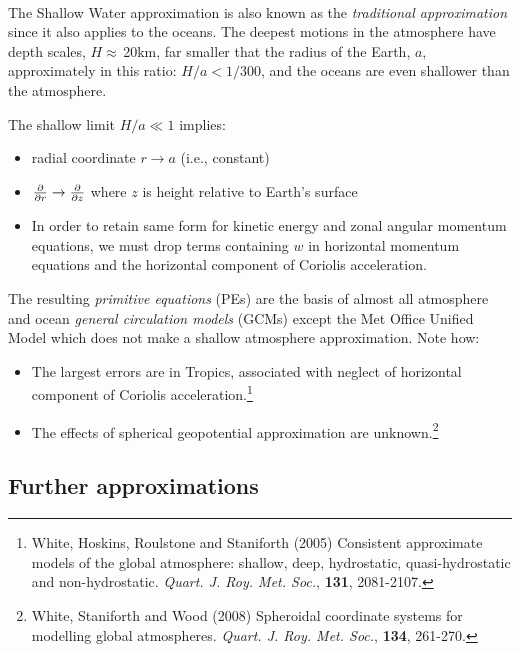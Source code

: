 ~

The Shallow Water approximation is also known as the {\em traditional approximation} since it also applies to the oceans. The deepest motions in the atmosphere have
depth scales, $H\approx\,$20km, far smaller that the radius of the Earth, $a$, approximately in this ratio: $H/a< 1/300$, and the oceans are even shallower than the atmosphere. 

\begin{definition} The shallow limit $H/a\ll 1$ implies:

\medskip

\begin{itemize}
\item radial coordinate $r\rightarrow a$ (i.e., constant)
\item $\frac{\partial }{\partial r}\rightarrow \frac{\partial }{\partial z}$ where $z$ is height relative to Earth's surface
\item In order to retain same form for kinetic energy and zonal angular
	momentum equations, we must drop terms containing $w$ in horizontal
	momentum equations and the horizontal component of Coriolis
	acceleration.
\end{itemize}
\end{definition}

The resulting {\em primitive equations} (PEs) are the basis of almost
all atmosphere and ocean {\em general circulation models} (GCMs)
except the Met Office Unified Model which does not make a shallow
atmosphere approximation. Note how: \\

\begin{itemize}
	\item
	The largest errors are in Tropics, associated with neglect of horizontal
	component of Coriolis acceleration.\footnote{\BTi White, Hoskins, Roulstone and Staniforth (2005) Consistent approximate models of the global atmosphere: shallow, deep, hydrostatic, quasi-hydrostatic and non-hydrostatic. \emph{Quart. J. Roy. Met. Soc.}, \textbf{131},
		2081-2107.
		\ETi }
	
	\item
	The effects of spherical geopotential approximation are unknown.\footnote{\BTi White, Staniforth and Wood (2008) Spheroidal coordinate systems for modelling global atmospheres. \emph{Quart. J. Roy. Met. Soc.}, \textbf{134},
		261-270.
		\ETi }
\end{itemize}


\subsection{Further approximations} 


